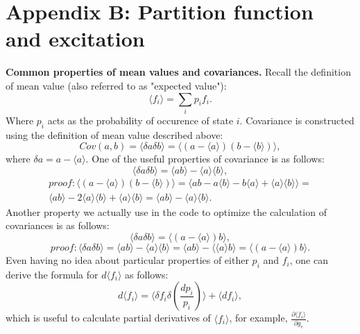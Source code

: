 \section{Appendix B: Partition function and excitation}
{\bf Common properties of mean values and covariances.}
Recall the definition of mean value (also referred to as "expected value"):
\begin{equation}
\langle f_i \rangle = \sum_i p_i f_i.
\end{equation}
Where $p_i$ acts as the probability of occurence of state $i$.
Covariance is constructed using the definition of mean value described above:
\begin{equation}
Cov(a,b) = \langle \delta a \delta b \rangle =
\langle (a - \langle a \rangle) (b - \langle b \rangle) \rangle,
\end{equation}
where $\delta a = a - \langle a \rangle$.
One of the useful properties of covariance is as follows:
\begin{equation}
\langle \delta a \delta b \rangle = \langle ab \rangle - \langle a \rangle \langle b \rangle,
\end{equation}
\begin{eqnarray}
\nonumber proof: \langle (a - \langle a \rangle) (b - \langle b \rangle) \rangle =
\langle ab - a \langle b \rangle - b \langle a \rangle + \langle a \rangle \langle b \rangle \rangle = \\ \nonumber
\langle ab \rangle - 2 \langle a \rangle \langle b \rangle + \langle a \rangle \langle b \rangle =
\langle ab \rangle - \langle a \rangle \langle b \rangle.
\end{eqnarray}
Another property we actually use in the code to optimize the
calculation of covariances is as follows:
\begin{equation}
\langle \delta a \delta b \rangle = \langle (a - \langle a \rangle) b \rangle,
\end{equation}
\begin{equation}
\nonumber proof: \langle \delta a \delta b \rangle =
\langle ab \rangle - \langle a \rangle \langle b \rangle =
\langle ab \rangle - \langle \langle a \rangle b \rangle =
\langle (a - \langle a \rangle) b \rangle.
\end{equation}
Even having no idea about particular properties of either $p_i$ and $f_i$,
one can derive the formula for $d \langle f_i \rangle$ as follows:
\begin{equation}
d \langle f_i \rangle = \langle \delta f_i \delta \left( \frac{d p_i}{p_i} \right) \rangle +
\langle d f_i \rangle,
\end{equation}
which is useful to calculate partial derivatives of $\langle f_i \rangle$,
for example, $\frac{\partial \langle f_i \rangle}{\partial g_e}$.

